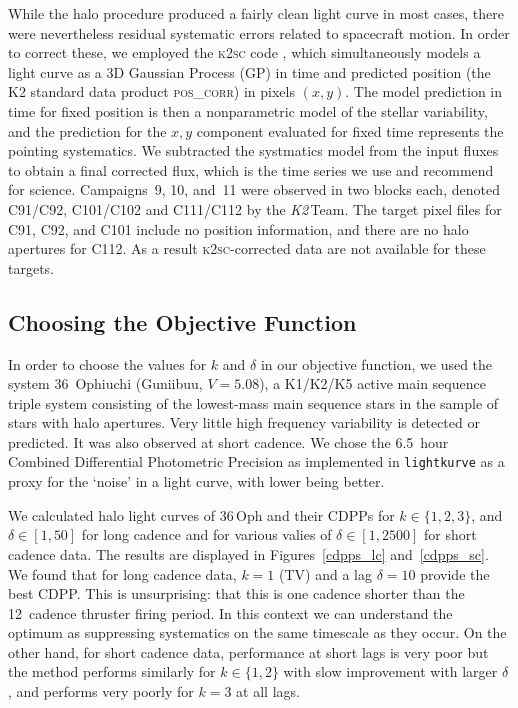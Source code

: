 \documentclass[modern]{aastex62}
\newcommand\ktwo{\emph{K2}\,}
\begin{document}
While the halo procedure produced a fairly clean light curve in most cases, there were nevertheless residual systematic errors related to spacecraft motion. In order to correct these, we employed the \textsc{k2sc} code \citep{Aigrain2015,k2sc}, which simultaneously models a light curve as a 3D Gaussian Process (GP) in time and predicted position (the K2 standard data product \textsc{pos\_corr}) in pixels $(x,y)$. The model prediction in time for fixed position is then a nonparametric model of the stellar variability, and the prediction for the $x,y$ component evaluated for fixed time represents the pointing systematics. We subtracted the systmatics model from the input fluxes to obtain a final corrected flux, which is the time series we use and recommend for science. Campaigns~9, 10, and~11 were observed in two blocks each, denoted C91/C92, C101/C102 and C111/C112 by the \ktwo Team. The target pixel files for C91, C92, and C101 include no position information, and there are no halo apertures for C112. As a result \textsc{k2sc}-corrected data are not available for these targets.

\subsection{Choosing the Objective Function}
\label{sec:objective}

In order to choose the values for $k$ and $\delta$ in our objective function, we used the system 36~Ophiuchi (Guniibuu, $V= 5.08$), a K1/K2/K5 active main sequence triple system consisting of the lowest-mass main sequence stars in the sample of stars with halo apertures. Very little high frequency variability is detected or predicted. It was also observed at short cadence. We chose the 6.5~hour Combined Differential Photometric Precision \citep[CDPP,][]{cdpp} as implemented in \texttt{lightkurve} \citep{lightkurve} as a proxy for the `noise' in a light curve, with lower being better. 

We calculated halo light curves of 36\,Oph and their CDPPs for $k \in \{1,2,3\}$, and $\delta \in [1,50]$ for long cadence and for various valies of $\delta \in [1,2500]$ for short cadence data. The results are displayed in Figures~\ref{cdpps_lc} and~\ref{cdpps_sc}. We found that for long cadence data, $k=1$ (TV) and a lag $\delta=10$ provide the best CDPP. This is unsurprising: that this is one cadence shorter than the 12~cadence thruster firing period. In this context we can understand the optimum as suppressing systematics on the same timescale as they occur. On the other hand, for short cadence data, performance at short lags is very poor but the method performs similarly for $k \in \{1,2\}$ with slow improvement with larger $\delta$, and performs very poorly for $k=3$ at all lags. 
\end{document}
